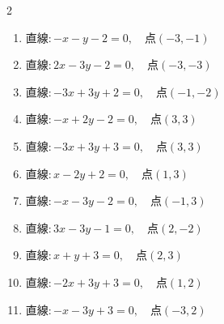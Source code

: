 \begin{multicols}{2}
\begin{enumerate}

\columnbreak %

\resetques

  \item $直線:-x-y-2=0,\quad 点 ( -3, -1 )$


  \item $直線:2x-3y-2=0,\quad 点 ( -3, -3 )$


  \item $直線:-3x+3y+2=0,\quad 点 ( -1, -2 )$


  \item $直線:-x+2y-2=0,\quad 点 ( 3, 3 )$


  \item $直線:-3x+3y+3=0,\quad 点 ( 3, 3 )$


  \item $直線:x-2y+2=0,\quad 点 ( 1, 3 )$


  \item $直線:-x-3y-2=0,\quad 点 ( -1, 3 )$


  \item $直線:3x-3y-1=0,\quad 点 ( 2, -2 )$


  \item $直線:x+y+3=0,\quad 点 ( 2, 3 )$


  \item $直線:-2x+3y+3=0,\quad 点 ( 1, 2 )$


\columnbreak %

  \item $直線:-x-3y+3=0,\quad 点 ( -3, 2 )$


\end{enumerate}
\end{multicols}
